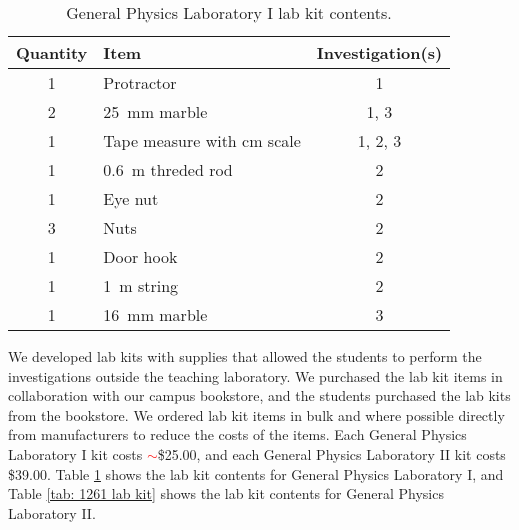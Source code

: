 \documentclass[aip, numerical, preprint]{revtex4-2}
\begin{document}
\begin{table}
  \caption{\label{tab: 1251 lab kit} General Physics Laboratory I lab kit contents.}
  \begin{tabular}{clc}
    \hline\hline
    Quantity & Item & Investigation(s)\\
    \hline
    1 & Protractor & 1 \\
    2 & \SI{25}{mm} marble & 1, 3 \\
    1 & Tape measure with cm scale & 1, 2, 3\\
    1 & \SI{0.6}{m} threded rod & 2 \\
    1 & Eye nut & 2 \\
    3 & Nuts & 2 \\
    1 & Door hook & 2 \\
    1 & \SI{1}{m} string & 2 \\
    1 & \SI{16}{mm} marble & 3 \\
    \hline\hline
  \end{tabular}
\end{table}

We developed lab kits with supplies that allowed the students to perform the investigations
outside the teaching laboratory. We purchased the lab kit items in collaboration with our
campus bookstore, and the students purchased the lab kits from the bookstore. We ordered lab
kit items in bulk and where possible directly from manufacturers to reduce the costs of the
items. Each General Physics Laboratory I kit costs \textcolor{red}{$\sim$}\$25.00, and each
General Physics Laboratory II kit costs \$39.00. Table \ref{tab: 1251 lab kit} shows the lab
kit contents for General Physics Laboratory I, and Table \ref{tab: 1261 lab kit} shows the lab
kit contents for General Physics Laboratory II.
\end{document}
